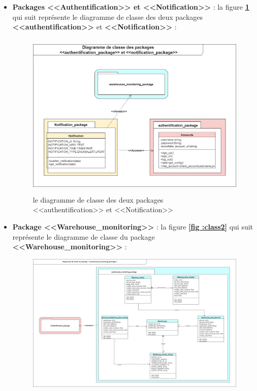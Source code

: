         \begin{itemize}
            \item\textbf{Packages <<Authentification>> et <<Notification>>} : la figure \textbf{\ref{fig :class1}} qui suit représente le diagramme de classe des deux packages \textbf{<<authentification>>} et \textbf{<<Notification>>} : 
            \begin{figure}[H]
                \centering
                \includegraphics[width =0.8\linewidth , height =8cm]{img/conception/class_auth_notif.png}
                \caption{le diagramme de classe des deux packages <<authentification>> et <<Notification>>}
                \label{fig :class1}
                \end{figure}
            \item\textbf{Package <<Warehouse\_monitoring>>} : la figure \textbf{\ref{fig :class2}} qui suit représente le diagramme de classe du package \textbf{<<Warehouse\_monitoring>>} : 
            \begin{figure}[H]
                \centering
                \includegraphics[width =0.8\linewidth]{img/conception/class_warehouse.png}

\end{figure}
\end{itemize}
